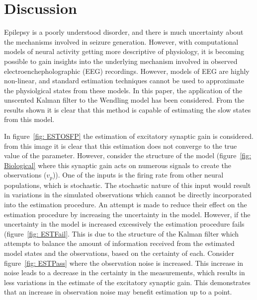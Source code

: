 \section{Discussion}

Epilepsy is a poorly understood disorder, and there is much uncertainty about the mechanisms involved in seizure generation. However, with computational models of neural activity getting more descriptive of physiology, it is becoming possible to gain insights into the underlying mechanism involved in observed electroenchepholographic (EEG) recordings. However, models of EEG are highly non-linear, and standard estimation techniques cannot be used to approximate the physiolgical states from these models. In this paper, the application of the unscented Kalman filter to the Wendling model has been considered. From the results shown it is clear that this method is capable of estimating the slow states from this model.

In  figure~\ref{fig: ESTOSFP} the estimation of excitatory synaptic gain is considered. from this image it is clear that this estimation does not converge to the true value of the parameter. However, consider the structure of the model (figure~\ref{fig: Biological} where this synaptic gain acts on numerous signals to create the observations ($v_{p}$)). One of the inputs is the firing rate from other neural populations, which is stochastic. The stochastic nature of this input would result in variations in the simulated observations which cannot be directly incorporated into the estimation procedure. An attempt is made to reduce their effect on the estimation procedure by increasing the uncertainty in the model. However, if the uncertainty in the model is increased excessively the estimation procedure fails (figure~\ref{fig: ESTFail}. This is due to the structure of the Kalman filter which attempts to balance the amount of information received from the estimated model states and the observations, based on the certainty of each. Consider figure~\ref{fig: ESTPass} where the observation noise is increased. This increase in noise leads to a decrease in the certainty in the measurements, which results in less variations in the estimate of the excitatory synaptic gain. This demonstrates that an increase in observation noise may benefit estimation up to a point.

